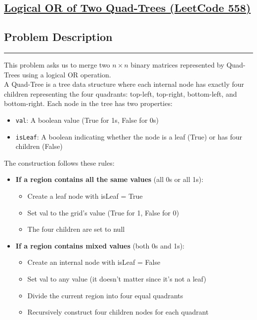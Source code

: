 \subsection {\href{https://leetcode.com/problems/logical-or-of-two-binary-grids-represented-as-quad-trees/description/}{Logical OR of Two Quad-Trees (LeetCode 558)}}

\subsection*{Problem Description}
\vspace{-1.5em}
\noindent\rule{\textwidth}{0.4pt}

This problem asks us to merge two $n \times n$ binary matrices represented by Quad-Trees using a logical OR operation.\\
A Quad-Tree is a tree data structure where each internal node has exactly four children representing the four quadrants: top-left, top-right, bottom-left, and bottom-right. Each node in the tree has two properties:
\begin{itemize}
    \item \texttt{val}: A boolean value (True for 1s, False for 0s)
    \item \texttt{isLeaf}: A boolean indicating whether the node is a leaf (True) or has four children (False)
\end{itemize}

The construction follows these rules:
\begin{itemize}
    \item \textbf{If a region contains all the same values} (all 0s or all 1s):
        \begin{itemize}
            \item Create a leaf node with isLeaf = True
            \item Set val to the grid's value (True for 1, False for 0)
            \item The four children are set to null
        \end{itemize}
    \item \textbf{If a region contains mixed values} (both 0s and 1s):
        \begin{itemize}
            \item Create an internal node with isLeaf = False
            \item Set val to any value (it doesn't matter since it's not a leaf)
            \item Divide the current region into four equal quadrants
            \item Recursively construct four children nodes for each quadrant
        \end{itemize}
\end{itemize}

